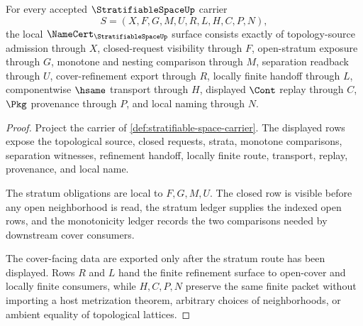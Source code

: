 \begin{theorem}
\label{thm:stratifiable-space-namecert-obligations}
For every accepted $\StratifiableSpaceUp$ carrier
$$
S=(X,F,G,M,U,R,L,H,C,P,N),
$$
the local $\NameCert_{\StratifiableSpaceUp}$ surface consists exactly of topology-source admission through $X$, closed-request visibility through $F$, open-stratum exposure through $G$, monotone and nesting comparison through $M$, separation readback through $U$, cover-refinement export through $R$, locally finite handoff through $L$, componentwise $\hsame$ transport through $H$, displayed $\Cont$ replay through $C$, $\Pkg$ provenance through $P$, and local naming through $N$.
\end{theorem}
\begin{proof}
Project the carrier of \autoref{def:stratifiable-space-carrier}. The displayed rows expose the topological source, closed requests, strata, monotone comparisons, separation witnesses, refinement handoff, locally finite route, transport, replay, provenance, and local name.

The stratum obligations are local to $F,G,M,U$. The closed row is visible before any open neighborhood is read, the stratum ledger supplies the indexed open rows, and the monotonicity ledger records the two comparisons needed by downstream cover consumers.

The cover-facing data are exported only after the stratum route has been displayed. Rows $R$ and $L$ hand the finite refinement surface to open-cover and locally finite consumers, while $H,C,P,N$ preserve the same finite packet without importing a host metrization theorem, arbitrary choices of neighborhoods, or ambient equality of topological lattices.
\end{proof}

